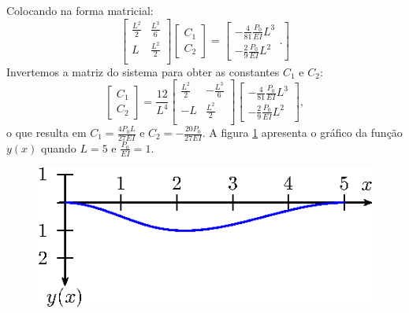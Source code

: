 Colocando na forma matricial:
\begin{equation}\left[\begin{array}{cc}
\frac{L^2}{2} & \frac{L^3}{6}\\
L & \frac{L^2}{2}\\
\end{array}
\right]\left[\begin{array}{c}
C_1\\
C_2\end{array}
\right]=\left[\begin{array}{c}
-\frac{4}{81}\frac{P_0}{EI}L^3\\
-\frac{2}{9}\frac{P_0}{EI}L^2\end{array}.
\right]
\end{equation}
 Invertemos a matriz do sistema para obter as constantes $C_1$ e $C_2$:
\begin{equation}\left[\begin{array}{c}
C_1\\
C_2\end{array}
\right]=
\frac{12}{L^4}
\left[\begin{array}{cc}
\frac{L^2}{2} & -\frac{L^3}{6}\\
-L & \frac{L^2}{2}\\
\end{array}
\right]\left[\begin{array}{c}
-\frac{4}{81}\frac{P_0}{EI}L^3\\
-\frac{2}{9}\frac{P_0}{EI}L^2\end{array}
\right],
\end{equation}
o que resulta em $C_1=\frac{4P_0 L}{27EI}$ e $C_2=-\frac{20P_0 }{27EI}$. A figura \ref{viga} apresenta o gráfico da função $y(x)$ quando $L=5$ e $\frac{P_0}{EI}=1$.
\begin{figure}[!ht]
\begin{center}

\includegraphics{cap_dirac_conv/pics/figura_11}\end{center}
\caption{\label{viga}}
\end{figure}


